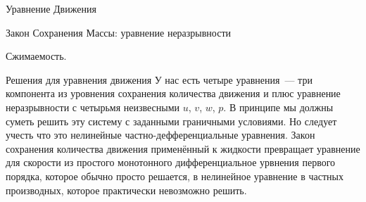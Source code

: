 \begin{chapter}{Уравнение Движения}
\begin{section}{Закон Сохранения Массы: уравнение неразрывности}
\begin{paragraph}{Сжимаемость.}
\end{paragraph}
\end{section}

\begin{section}{Решения для уравнения движения}
У нас есть четыре уравнения~--- три компонента из уровнения сохранения
количества движения и плюс уравнение неразрывности с четырьмя
неизвесными $u$, $v$, $w$, $p$. В принципе мы должны суметь решить эту
систему с заданными граничными условиями.  Но следует учесть что это
нелинейные частно-дефференциальные уравнения. Закон сохранения
количества движения применённый к жидкости превращает уравнение для
скорости из простого монотонного дифференциальное урвнения первого
порядка, которое обычно просто решается, в нелинейное уравнение в
частных производных, которое практически невозможно решить.
%


\end{section}
\end{chapter}
